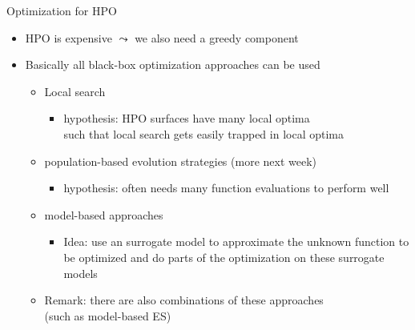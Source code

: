 \begin{frame}[c,fragile]{Optimization for HPO}

\begin{itemize}
	\item HPO is expensive $\leadsto$ we also need a greedy component
	\item Basically all black-box optimization approaches can be used
	\begin{itemize}
		\item Local search
		\begin{itemize}
			\item hypothesis: HPO surfaces have many local optima\\ such that local search gets easily trapped in local optima
		\end{itemize}
	 	\medskip
		\item population-based evolution strategies (more next week)
		\begin{itemize}
			\item hypothesis: often needs many function evaluations to perform well
		\end{itemize}
		\medskip
		\item model-based approaches
		\begin{itemize}
			\item Idea: use an surrogate model to approximate the unknown function to be optimized and do parts of the optimization on these surrogate models
		\end{itemize}
	    \item Remark: there are also combinations of these approaches\\ (such as model-based ES)
	\end{itemize}
\end{itemize}

\end{frame}
